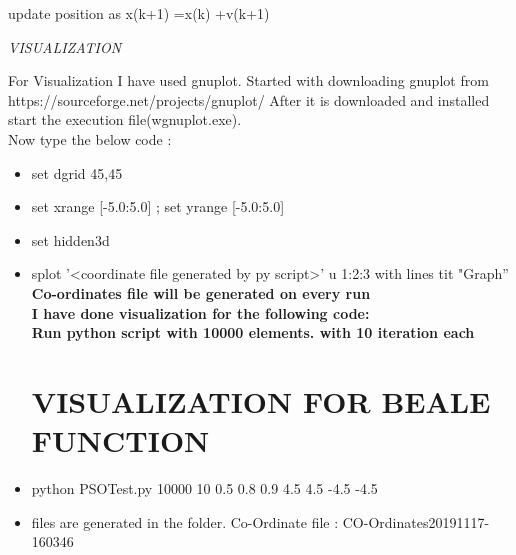 \documentclass{article}
\begin{document}
\begin{center}
\begin{center}
\begin{center}
\begin{minipage}{33em}
\begin{itemize}
					 update position as x(k+1) =x(k) +v(k+1)

       
       
       

  
\end{itemize}


\end{minipage}
\end{center}

\end{center}

\newpage

\begin{center}

\begin{center}
\emph{\LARGE VISUALIZATION}\\[0.5cm]
    
\end{center}
\begin{center}
\begin{minipage}{33em}
\noindent
For Visualization I have used gnuplot.
Started with downloading gnuplot from https://sourceforge.net/projects/gnuplot/
After it is  downloaded and installed start the execution file(wgnuplot.exe). 
\\[1pt]
Now type the below code :
\begin{itemize}
    \item set dgrid 45,45
    \item set xrange [-5.0:5.0] ; set yrange [-5.0:5.0]
    \item set hidden3d
    \item splot '<coordinate file generated by py script>' u 1:2:3 with lines tit "Graph”
\\[1pt]
\textbf{Co-ordinates file will be generated on every run}
\\[0.25pt]
\textbf{I have done visualization for the following code:}
\\[0.30pt]
\textbf{Run python script with 10000 elements. with 10 iteration each}

\section*{VISUALIZATION FOR BEALE FUNCTION}
 
\item python PSOTest.py 10000 10 0.5 0.8 0.9 4.5 4.5 -4.5 -4.5

\item files are generated in the folder. Co-Ordinate file : CO-Ordinates20191117-160346



\end{itemize}
\end{minipage}
\end{center}
\end{center}
\end{center}
\end{document}
